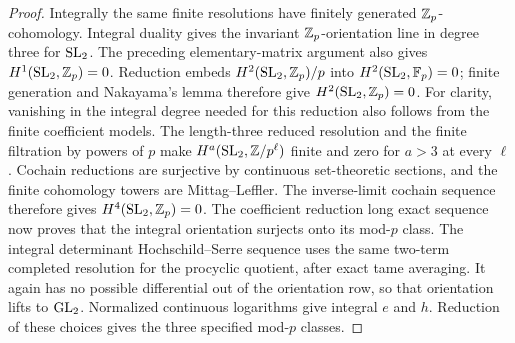 \begin{proof}
Integrally the same finite resolutions have finitely generated
$\mathbb Z_p$-cohomology.  Integral duality gives the invariant
$\mathbb Z_p$-orientation line in degree three for $\operatorname{SL}_2$.
The preceding elementary-matrix argument also gives
$H^1(\operatorname{SL}_2,\mathbb Z_p)=0$.  Reduction embeds
$H^2(\operatorname{SL}_2,\mathbb Z_p)/p$ into $H^2(\operatorname{SL}_2,\mathbb F_p)=0$;
finite generation and Nakayama's lemma therefore give
$H^2(\operatorname{SL}_2,\mathbb Z_p)=0$.
For clarity, vanishing in the integral degree needed for this reduction
also follows from the finite coefficient models.  The length-three
reduced resolution and the finite filtration by powers of $p$ make
$H^a(\operatorname{SL}_2,\mathbb Z/p^\ell)$ finite and zero for $a>3$ at every
$\ell$.  Cochain reductions are surjective by continuous set-theoretic
sections, and the finite cohomology towers are Mittag--Leffler.  The
inverse-limit cochain sequence therefore gives
$H^4(\operatorname{SL}_2,\mathbb Z_p)=0$.  The coefficient reduction long exact
sequence now proves that the integral orientation surjects onto its
mod-$p$ class.  The integral determinant Hochschild--Serre sequence uses the same
two-term completed resolution for the procyclic quotient, after exact
tame averaging.  It again has no possible differential out of the
orientation row, so that orientation lifts to $\operatorname{GL}_2$.  Normalized continuous
logarithms give integral $e$ and $h$.  Reduction of these choices
gives the three specified mod-$p$ classes.
\end{proof}

